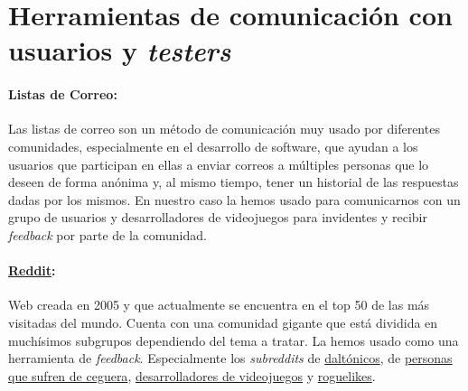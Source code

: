 \section{Herramientas de comunicación con usuarios y \textit{testers}}

\paragraph{Listas de Correo:} Las listas de correo son un método de comunicación muy usado por diferentes comunidades, especialmente en el desarrollo de software, que ayudan a los usuarios que participan en ellas a enviar correos a múltiples personas que lo deseen de forma anónima y, al mismo tiempo, tener un historial de las respuestas dadas por los mismos. En nuestro caso la hemos usado para comunicarnos con un grupo de usuarios y desarrolladores de videojuegos para invidentes y recibir \textit{feedback} por parte de la comunidad.

 \paragraph{\href{www.reddit.com}{Reddit}:} Web creada en 2005 y que actualmente se encuentra en el top 50 de las más visitadas del mundo. Cuenta con una comunidad gigante que está dividida en muchísimos subgrupos dependiendo del tema a tratar. La hemos usado como una herramienta de \textit{feedback}. Especialmente los \textit{subreddits} de \href{https://www.reddit.com/r/ColorBlind/}{daltónicos}, de \href{https://www.reddit.com/r/blind/}{personas que sufren de ceguera}, \href{https://www.reddit.com/r/gamedev/}{desarrolladores de videojuegos} y \href{https://www.reddit.com/r/roguelikes/}{roguelikes}.
